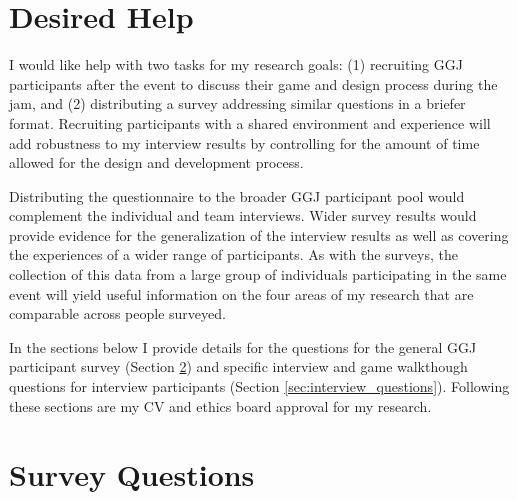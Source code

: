 \documentclass[]{article}
\begin{document}


\section{Desired Help}
I would like help with two tasks for my research goals: (1) recruiting GGJ participants after the event to discuss their game and design process during the jam, and (2) distributing a survey addressing similar questions in a briefer format. Recruiting participants with a shared environment and experience will add robustness to my interview results by controlling for the amount of time allowed for the design and development process.

Distributing the questionnaire to the broader GGJ participant pool would complement the individual and team interviews. Wider survey results would provide evidence for the generalization of the interview results as well as covering the experiences of a wider range of participants. As with the surveys, the collection of this data from a large group of individuals participating in the same event will yield useful information on the four areas of my research that are comparable across people surveyed. 

In the sections below I provide details for the questions for the general GGJ participant survey (Section \ref{sec:survey_questions}) and specific interview and game walkthough questions for interview participants (Section \ref{sec:interview_questions}). Following these sections are my CV and ethics board approval for my research.

\section{Survey Questions}
\label{sec:survey_questions}
\end{document}
